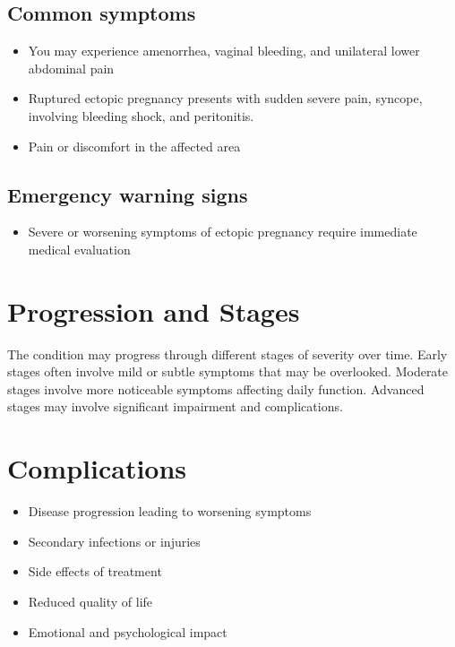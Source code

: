 \subsection{Common symptoms}
\begin{itemize}[noitemsep]
  \item You may experience amenorrhea, vaginal bleeding, and unilateral lower abdominal pain
  \item Ruptured ectopic pregnancy presents with sudden severe pain, syncope, involving bleeding shock, and peritonitis.
  \item Pain or discomfort in the affected area
  \end{itemize}

\subsection{Emergency warning signs}
\begin{itemize}[noitemsep]
  \item Severe or worsening symptoms of ectopic pregnancy require immediate medical evaluation
\end{itemize}
\section{Progression and Stages}
The condition may progress through different stages of severity over time. Early stages often involve mild or subtle symptoms that may be overlooked. Moderate stages involve more noticeable symptoms affecting daily function. Advanced stages may involve significant impairment and complications.
\section{Complications}
\begin{itemize}[noitemsep]
  \item Disease progression leading to worsening symptoms
  \item Secondary infections or injuries
  \item Side effects of treatment
  \item Reduced quality of life
  \item Emotional and psychological impact
\end{itemize}
